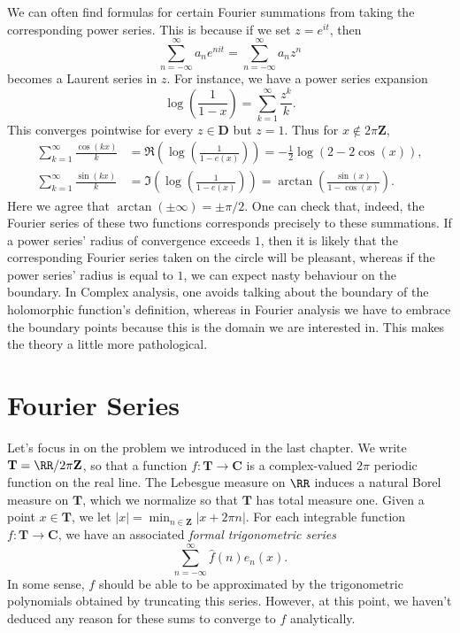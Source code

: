 \begin{example}
    We can often find formulas for certain Fourier summations from taking the corresponding power series. This is because if we set $z = e^{it}$, then
    \[ \sum_{n = -\infty}^\infty a_n e^{nit} = \sum_{n = -\infty}^\infty a_n z^n \]
    becomes a Laurent series in $z$. For instance, we have a power series expansion
    \[ \log \left( \frac{1}{1-x} \right) = \sum_{k = 1}^\infty \frac{z^k}{k}. \]
    This converges pointwise for every $z \in \mathbf{D}$ but $z = 1$. Thus for $x \not \in 2 \pi \mathbf{Z}$,
    \begin{align*}
        \sum_{k = 1}^\infty \frac{\cos(kx)}{k} &= \Re \left( \log \left( \frac{1}{1 - e(x)} \right) \right) = -\frac{1}{2} \log(2 - 2\cos(x)),\\
        \sum_{k = 1}^\infty \frac{\sin(kx)}{k} &= \Im \left( \log \left( \frac{1}{1 - e(x)} \right) \right) = \arctan \left( \frac{\sin(x)}{1 - \cos(x)} \right).
    \end{align*}
    Here we agree that $\arctan(\pm \infty) = \pm \pi/2$. One can check that, indeed, the Fourier series of these two functions corresponds precisely to these summations. If a power series' radius of convergence exceeds $1$, then it is likely that the corresponding Fourier series taken on the circle will be pleasant, whereas if the power series' radius is equal to $1$, we can expect nasty behaviour on the boundary. In Complex analysis, one avoids talking about the boundary of the holomorphic function's definition, whereas in Fourier analysis we have to embrace the boundary points because this is the domain we are interested in. This makes the theory a little more pathological.
\end{example}

\chapter{Fourier Series}

Let's focus in on the problem we introduced in the last chapter. We write $\mathbf{T} = \RR / 2 \pi \mathbf{Z}$, so that a function $f: \mathbf{T} \to \mathbf{C}$ is a complex-valued $2 \pi$ periodic function on the real line. The Lebesgue measure on $\RR$ induces a natural Borel measure on $\mathbf{T}$, which we normalize so that $\mathbf{T}$ has total measure one. Given a point $x \in \mathbf{T}$, we let $|x| = \min_{n \in \mathbf{Z}} |x + 2\pi n|$. For each integrable function $f: \mathbf{T} \to \mathbf{C}$, we have an associated \emph{formal trigonometric series}
%
\[ \sum_{n = -\infty}^\infty \widehat{f}(n) e_n(x). \]
%
In some sense, $f$ should be able to be approximated by the trigonometric polynomials obtained by truncating this series. However, at this point, we haven't deduced any reason for these sums to converge to $f$ analytically.

